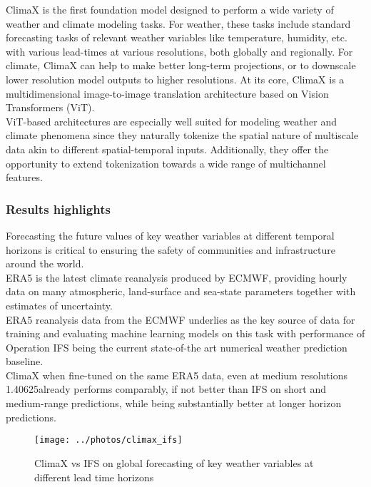 \documentclass[../paper.tex]{subfiles}
\begin{document}
    ClimaX is the first foundation model designed to perform a wide variety of weather and climate modeling tasks.
    For weather, these tasks include standard forecasting tasks of relevant weather variables like temperature,
    humidity, etc.
    with various lead-times at various resolutions, both globally and regionally.
    For climate, ClimaX can help to make better long-term projections,
    or to downscale lower resolution model outputs to higher resolutions.
    At its core, ClimaX is a multidimensional image-to-image translation architecture based on Vision Transformers
    (ViT).\\
    ViT-based architectures are especially well suited for modeling weather and climate phenomena
    since they naturally tokenize the spatial nature of multiscale data akin to different spatial-temporal inputs.
    Additionally,
    they offer the opportunity to extend tokenization towards a wide range of multichannel features.\cite{d1}
    \subsubsection{Results highlights}
        Forecasting the future values of key weather variables at different temporal horizons is critical
        to ensuring the safety of communities and infrastructure around the world.\\
        ERA5 is the latest climate reanalysis produced by ECMWF,
        providing hourly data on many atmospheric,
        land-surface and sea-state parameters together with estimates of uncertainty.\cite{d2} \\
        ERA5 reanalysis data from the ECMWF underlies as the key source of data for training
        and evaluating machine learning models on this task with performance of Operation
        IFS being the current state-of-the art numerical weather prediction baseline.\\
        ClimaX when fine-tuned on the same ERA5 data,
        even at medium resolutions 1.40625\textdegree already performs comparably,
        if not better than IFS on short and medium-range predictions,
        while being substantially better at longer horizon predictions.\cite{d1}
        \begin{figure}[htbp]
        \centerline{\texttt{[image: ../photos/climax\_ifs]}}
        \caption{ClimaX vs IFS on global forecasting of key weather variables at different lead time horizons}
        \label{fig:climax-vs-ifs}
        \end{figure}
\end{document}
